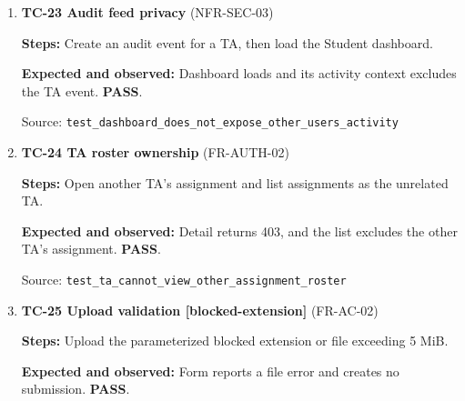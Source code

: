 \begin{enumerate}
\begin{minipage}[t]{\linewidth}
\textbf{Steps:} Post a checklist change against a draft, archived, closed or future round, as indicated by the parameters.\par

\textbf{Expected and observed:} HTTP 403 and no ChecklistCompletion row. \textbf{PASS}.\par

{\footnotesize Source: \nolinkurl{test_checklist_changes_require_open_round[published-2]}}\end{minipage}

\item \begin{minipage}[t]{\linewidth}\textbf{TC-23 Audit feed privacy } (NFR-SEC-03)\par

\textbf{Steps:} Create an audit event for a TA, then load the Student dashboard.\par

\textbf{Expected and observed:} Dashboard loads and its activity context excludes the TA event. \textbf{PASS}.\par

{\footnotesize Source: \nolinkurl{test_dashboard_does_not_expose_other_users_activity}}\end{minipage}

\item \begin{minipage}[t]{\linewidth}\textbf{TC-24 TA roster ownership } (FR-AUTH-02)\par

\textbf{Steps:} Open another TA's assignment and list assignments as the unrelated TA.\par

\textbf{Expected and observed:} Detail returns 403, and the list excludes the other TA's assignment. \textbf{PASS}.\par

{\footnotesize Source: \nolinkurl{test_ta_cannot_view_other_assignment_roster}}\end{minipage}

\item \begin{minipage}[t]{\linewidth}\textbf{TC-25 Upload validation [blocked-extension]} (FR-AC-02)\par

\textbf{Steps:} Upload the parameterized blocked extension or file exceeding 5 MiB.\par

\textbf{Expected and observed:} Form reports a file error and creates no submission. \textbf{PASS}.\par


\end{minipage}
\end{enumerate}
